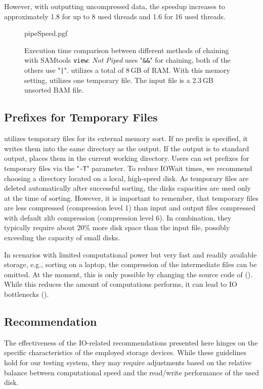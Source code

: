 However, with \sort outputting uncompressed data, the speedup increases to approximately 1.8 for up to 8 used threads and 1.6 for 16 used threads.
\begin{figure}[h]
        {pipeSpeed.pgf}
    \caption{Execution time comparison between different methods of chaining \sort with SAMtools \texttt{view}: \textit{Not Piped} uses "\texttt{\&\&}" for chaining, both of the others use "\texttt{|}". \sort utilizes a total of 8\,GB of RAM. With this memory setting, \sort utilizes one temporary file. \threads \points The input file is a 2.3\,GB unsorted BAM file. 
    }
    \label{fig:pipeSpeeds}
\end{figure}

\subsection{Prefixes for Temporary Files}
 \sort utilizes temporary files for its external memory sort. If no prefix is specified, it writes them into the same directory as the output. If the output is to standard output, \sort places them in the current working directory. Users can set prefixes for temporary files via the "\texttt{-T}" parameter. To reduce IOWait times, we recommend choosing a directory located on a local, high-speed disk. As temporary files are deleted automatically after successful sorting, the disks capacities are used only at the time of sorting. However, it is important to remember, that temporary files are less compressed (compression level 1) than input and output files compressed with default zlib compression (compression level 6). In combination, they typically require about 20\% more disk space than the input file, possibly exceeding the capacity of small disks.
 
 In scenarios with limited computational power but very fast and readily available storage, e.g., sorting on a laptop, the compression of the intermediate files can be omitted. At the moment, this is only possible by changing the source code of \sort (). While this reduces the amount of computations \sort performs, it can lead to IO bottlenecks ().

\subsection{Recommendation}
The effectiveness of the IO-related recommendations presented here hinges on the specific characteristics of the employed storage devices. While these guidelines hold for our testing system, they may require adjustments based on the relative balance between computational speed and the read/write performance of the used disk.  

